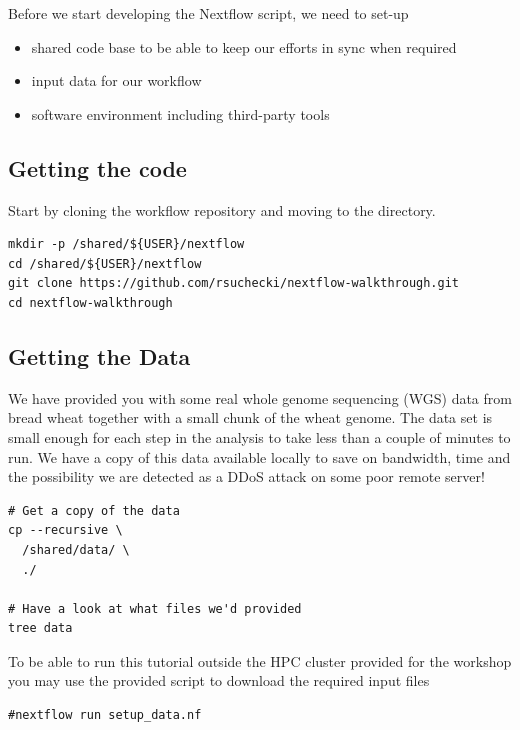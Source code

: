 Before we start developing the Nextflow script, we need to set-up 
\begin{itemize}
  \item shared code base to be able to keep our efforts in sync when required
  \item input data for our workflow
  \item software environment including third-party tools
\end{itemize}



\subsection{Getting the code}

\begin{steps}
Start by cloning the workflow repository and moving to the directory.

\begin{lstlisting}
mkdir -p /shared/${USER}/nextflow
cd /shared/${USER}/nextflow
git clone https://github.com/rsuchecki/nextflow-walkthrough.git 
cd nextflow-walkthrough
\end{lstlisting}
\end{steps}



\subsection{Getting the Data}

We have provided you with some real whole genome sequencing (WGS) data from bread wheat together with a small chunk of the wheat genome.
The data set is small enough for each step in the analysis to take less than a couple of minutes to run. 
We have a copy of this data available locally to save on bandwidth, time and the possibility we are detected as a DDoS attack on some poor remote server!

\begin{steps}
\begin{lstlisting}
# Get a copy of the data
cp --recursive \
  /shared/data/ \
  ./

# Have a look at what files we'd provided
tree data
\end{lstlisting}
\end{steps}

\begin{warning}
To be able to run this tutorial outside the HPC cluster provided for the workshop you may use 
the provided script to download the required input files
\begin{lstlisting}
#nextflow run setup_data.nf
\end{lstlisting}
\end{warning}


